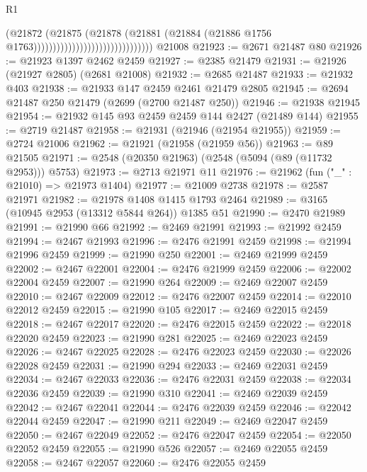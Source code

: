 \begin{lexlean}{R1}
\begin{coremodule}
                                                      (@21872
                                                        (@21875
                                                          (@21878
                                                            (@21881
                                                              (@21884
                                                                (@21886
                                                                  @1756
                                                                  @1763)))))))))))))))))))))))))))))))
    @21008
@21923 := @2671 @21487 @80
@21926 := @21923 @1397 @2462 @2459
@21927 := @2385 @21479
@21931 := @21926 (@21927 @2805) (@2681 @21008)
@21932 := @2685 @21487
@21933 := @21932 @403
@21938 := @21933 @147 @2459 @2461 @21479 @2805
@21945 := @2694 @21487 @250 @21479 (@2699 (@2700 @21487 @250))
@21946 := @21938 @21945
@21954 := @21932 @145 @93 @2459 @2459 @144 @2427 (@21489 @144)
@21955 := @2719 @21487
@21958 := @21931 (@21946 (@21954 @21955))
@21959 := @2724 @21006
@21962 := @21921 (@21958 (@21959 @56))
@21963 := @89 @21505
@21971 := @2548 (@20350 @21963) (@2548 (@5094 (@89 (@11732 @2953))) @5753)
@21973 := @2713 @21971 @11
@21976 := @21962 (fun ("_" : @21010) => @21973 @1404)
@21977 := @21009 @2738
@21978 := @2587 @21971
@21982 := @21978 @1408 @1415 @1793 @2464
@21989 := @3165 (@10945 @2953 (@13312 @5844 @264)) @1385 @51
@21990 := @2470 @21989
@21991 := @21990 @66
@21992 := @2469 @21991
@21993 := @21992 @2459
@21994 := @2467 @21993
@21996 := @2476 @21991 @2459
@21998 := @21994 @21996 @2459
@21999 := @21990 @250
@22001 := @2469 @21999 @2459
@22002 := @2467 @22001
@22004 := @2476 @21999 @2459
@22006 := @22002 @22004 @2459
@22007 := @21990 @264
@22009 := @2469 @22007 @2459
@22010 := @2467 @22009
@22012 := @2476 @22007 @2459
@22014 := @22010 @22012 @2459
@22015 := @21990 @105
@22017 := @2469 @22015 @2459
@22018 := @2467 @22017
@22020 := @2476 @22015 @2459
@22022 := @22018 @22020 @2459
@22023 := @21990 @281
@22025 := @2469 @22023 @2459
@22026 := @2467 @22025
@22028 := @2476 @22023 @2459
@22030 := @22026 @22028 @2459
@22031 := @21990 @294
@22033 := @2469 @22031 @2459
@22034 := @2467 @22033
@22036 := @2476 @22031 @2459
@22038 := @22034 @22036 @2459
@22039 := @21990 @310
@22041 := @2469 @22039 @2459
@22042 := @2467 @22041
@22044 := @2476 @22039 @2459
@22046 := @22042 @22044 @2459
@22047 := @21990 @211
@22049 := @2469 @22047 @2459
@22050 := @2467 @22049
@22052 := @2476 @22047 @2459
@22054 := @22050 @22052 @2459
@22055 := @21990 @526
@22057 := @2469 @22055 @2459
@22058 := @2467 @22057
@22060 := @2476 @22055 @2459

\end{coremodule}
\end{lexlean}
